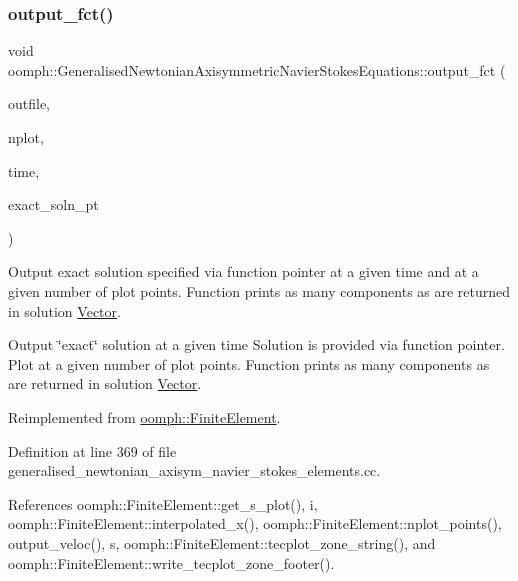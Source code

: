 \subsubsection{\texorpdfstring{output\+\_\+fct()}{output\_fct()}\hspace{0.1cm}{\footnotesize\ttfamily [2/2]}}
{\footnotesize\ttfamily void oomph\+::\+Generalised\+Newtonian\+Axisymmetric\+Navier\+Stokes\+Equations\+::output\+\_\+fct (\begin{DoxyParamCaption}\item[{std\+::ostream \&}]{outfile,  }\item[{const unsigned \&}]{nplot,  }\item[{const double \&}]{time,  }\item[{\hyperlink{classoomph_1_1FiniteElement_ad4ecf2b61b158a4b4d351a60d23c633e}{Finite\+Element\+::\+Unsteady\+Exact\+Solution\+Fct\+Pt}}]{exact\+\_\+soln\+\_\+pt }\end{DoxyParamCaption})\hspace{0.3cm}{\ttfamily [virtual]}}



Output exact solution specified via function pointer at a given time and at a given number of plot points. Function prints as many components as are returned in solution \hyperlink{classoomph_1_1Vector}{Vector}. 

Output \char`\"{}exact\char`\"{} solution at a given time Solution is provided via function pointer. Plot at a given number of plot points. Function prints as many components as are returned in solution \hyperlink{classoomph_1_1Vector}{Vector}. 

Reimplemented from \hyperlink{classoomph_1_1FiniteElement_a2a8426dccd57b927be0ae0eec00d0479}{oomph\+::\+Finite\+Element}.



Definition at line 369 of file generalised\+\_\+newtonian\+\_\+axisym\+\_\+navier\+\_\+stokes\+\_\+elements.\+cc.



References oomph\+::\+Finite\+Element\+::get\+\_\+s\+\_\+plot(), i, oomph\+::\+Finite\+Element\+::interpolated\+\_\+x(), oomph\+::\+Finite\+Element\+::nplot\+\_\+points(), output\+\_\+veloc(), s, oomph\+::\+Finite\+Element\+::tecplot\+\_\+zone\+\_\+string(), and oomph\+::\+Finite\+Element\+::write\+\_\+tecplot\+\_\+zone\+\_\+footer().

\mbox{\label{classoomph_1_1GeneralisedNewtonianAxisymmetricNavierStokesEquations_a6d1a6a907d2a90a45c50ef8ced117b6d}} 
